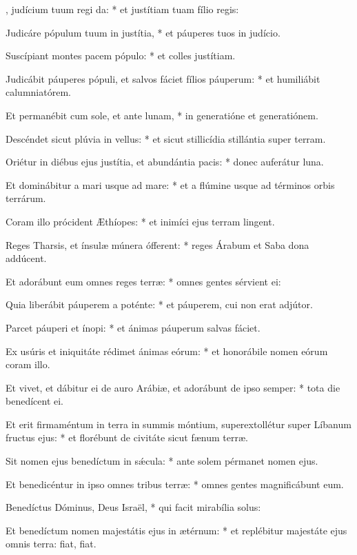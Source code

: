 \begin{psalmus}

    , judícium tuum regi da: * et justítiam tuam fílio regis:

    Judicáre pópulum tuum in justítia, * et páuperes tuos in judício.

    Suscípiant montes pacem pópulo: * et colles justítiam.

    Judicábit páuperes pópuli, et salvos fáciet fílios páuperum: * et humiliábit calumniatórem.

    Et permanébit cum sole, et ante lunam, * in generatióne et generatiónem.

    Descéndet sicut plúvia in vellus: * et sicut stillicídia stillántia super terram.

    Oriétur in diébus ejus justítia, et abundántia pacis: * donec auferátur luna.

    Et dominábitur a mari usque ad mare: * et a flúmine usque ad términos orbis terrárum.

    Coram illo prócident Æthíopes: * et inimíci ejus terram lingent.

    Reges Tharsis, et ínsulæ múnera ófferent: * reges Árabum et Saba dona addúcent.

    Et adorábunt eum omnes reges terræ: * omnes gentes sérvient ei:

    Quia liberábit páuperem a poténte: * et páuperem, cui non erat adjútor.

    Parcet páuperi et ínopi: * et ánimas páuperum salvas fáciet.

    Ex usúris et iniquitáte rédimet ánimas eórum: * et honorábile nomen eórum coram illo.

    Et vivet, et dábitur ei de auro Arábiæ, et adorábunt de ipso semper: * tota die benedícent ei.

    Et erit firmaméntum in terra in summis móntium, superextollétur super Líbanum fructus ejus: * et florébunt de civitáte sicut fænum terræ.

    Sit nomen ejus benedíctum in sǽcula: * ante solem pérmanet nomen ejus.

    Et benedicéntur in ipso omnes tribus terræ: * omnes gentes magnificábunt eum.

    Benedíctus Dóminus, Deus Israël, * qui facit mirabília solus:

    Et benedíctum nomen majestátis ejus in ætérnum: * et replébitur majestáte ejus omnis terra: fiat, fiat.

\end{psalmus}
